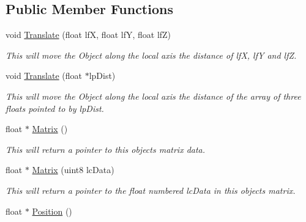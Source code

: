 \subsection*{Public Member Functions}
\begin{DoxyCompactItemize}
\item 
\hypertarget{classc_matrix4_af728db2d340a48de20d9f9e143e3a19b}{
void \hyperlink{classc_matrix4_af728db2d340a48de20d9f9e143e3a19b}{Translate} (float lfX, float lfY, float lfZ)}
\label{classc_matrix4_af728db2d340a48de20d9f9e143e3a19b}

\begin{DoxyCompactList}\small\item\em This will move the Object along the local axis the distance of lfX, lfY and lfZ. \end{DoxyCompactList}\item 
\hypertarget{classc_matrix4_a70935a369368c343c32efe6c47877e03}{
void \hyperlink{classc_matrix4_a70935a369368c343c32efe6c47877e03}{Translate} (float $\ast$lpDist)}
\label{classc_matrix4_a70935a369368c343c32efe6c47877e03}

\begin{DoxyCompactList}\small\item\em This will move the Object along the local axis the distance of the array of three floats pointed to by lpDist. \end{DoxyCompactList}\item 
\hypertarget{classc_matrix4_a8697973a28e45b0866cce4cdba2e216d}{
float $\ast$ \hyperlink{classc_matrix4_a8697973a28e45b0866cce4cdba2e216d}{Matrix} ()}
\label{classc_matrix4_a8697973a28e45b0866cce4cdba2e216d}

\begin{DoxyCompactList}\small\item\em This will return a pointer to this objects matrix data. \end{DoxyCompactList}\item 
\hypertarget{classc_matrix4_a1e70788aed256a22cf62b11a12e0db74}{
float $\ast$ \hyperlink{classc_matrix4_a1e70788aed256a22cf62b11a12e0db74}{Matrix} (uint8 lcData)}
\label{classc_matrix4_a1e70788aed256a22cf62b11a12e0db74}

\begin{DoxyCompactList}\small\item\em This will return a pointer to the float numbered lcData in this objects matrix. \end{DoxyCompactList}\item 
\hypertarget{classc_matrix4_a7b0917b0f0a69d73ed41d05fd37d52ac}{
float $\ast$ \hyperlink{classc_matrix4_a7b0917b0f0a69d73ed41d05fd37d52ac}{Position} ()}
\label{classc_matrix4_a7b0917b0f0a69d73ed41d05fd37d52ac}


\end{DoxyCompactItemize}
